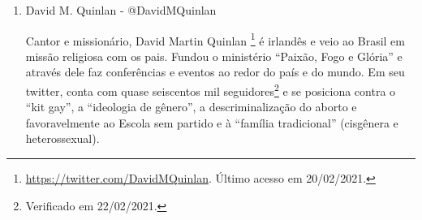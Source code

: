 \documentclass[
	12pt,				%
	openright,			%
	twoside,			%
	a4paper,			%
	english,			%
	brazil				%
	]{abntex2}
\begin{document}
\begin{anexosenv}
\begin{enumerate}
 
 
 
 \newpage
 
 \item David M. Quinlan - @DavidMQuinlan
 
 Cantor e missionário, David Martin Quinlan \footnote{\url{https://twitter.com/DavidMQuinlan}. Último acesso em 20/02/2021.} é irlandês e veio ao Brasil em missão religiosa com os pais. Fundou o ministério ``Paixão, Fogo e Glória'' e através dele faz conferências e eventos ao redor do país e do mundo. Em seu twitter, conta com quase seiscentos mil seguidores\footnote{Verificado em 22/02/2021.} e se posiciona contra o ``kit gay'', a ``ideologia de gênero'', a descriminalização do aborto e favoravelmente ao Escola sem partido e à ``família tradicional'' (cisgênera e heterossexual).
 
 

\end{enumerate}
\end{anexosenv}
\end{document}
